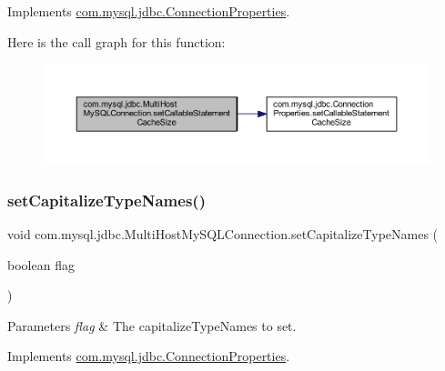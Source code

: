 Implements \mbox{\hyperlink{interfacecom_1_1mysql_1_1jdbc_1_1_connection_properties_ab22fc3c53b2a21bf9064036222219e22}{com.\+mysql.\+jdbc.\+Connection\+Properties}}.

Here is the call graph for this function\+:
\nopagebreak
\begin{figure}[H]
\begin{center}
\leavevmode
\includegraphics[width=350pt]{classcom_1_1mysql_1_1jdbc_1_1_multi_host_my_s_q_l_connection_a738d6bb9fa72c912b24fa0fb9d978af9_cgraph}
\end{center}
\end{figure}
\mbox{\label{classcom_1_1mysql_1_1jdbc_1_1_multi_host_my_s_q_l_connection_ac07f4457ad5a749c3abc81dec0fb0490}} 
\subsubsection{\texorpdfstring{set\+Capitalize\+Type\+Names()}{setCapitalizeTypeNames()}}
{\footnotesize\ttfamily void com.\+mysql.\+jdbc.\+Multi\+Host\+My\+S\+Q\+L\+Connection.\+set\+Capitalize\+Type\+Names (\begin{DoxyParamCaption}\item[{boolean}]{flag }\end{DoxyParamCaption})}


\begin{DoxyParams}{Parameters}
{\em flag} & The capitalize\+Type\+Names to set. \\
\hline
\end{DoxyParams}


Implements \mbox{\hyperlink{interfacecom_1_1mysql_1_1jdbc_1_1_connection_properties_a4a5d21e7dfd9bedd2eb10f3169629288}{com.\+mysql.\+jdbc.\+Connection\+Properties}}.

